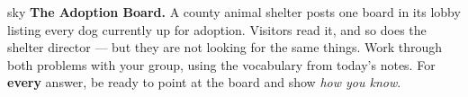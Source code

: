 \documentclass[10pt]{article}
\begin{document}

\vspace{0.10in}

\boxguard[10]
\begin{headlinebox}{sky}
\small
\textbf{The Adoption Board.} A county animal shelter posts one board in its lobby listing every
dog currently up for adoption. Visitors read it, and so does the shelter director --- but they
are not looking for the same things. Work through both problems with your group, using the
vocabulary from today's notes. For \textbf{every} answer, be ready to point at the board and
show \emph{how you know}.
\end{headlinebox}

\vspace{0.10in}
\end{document}
